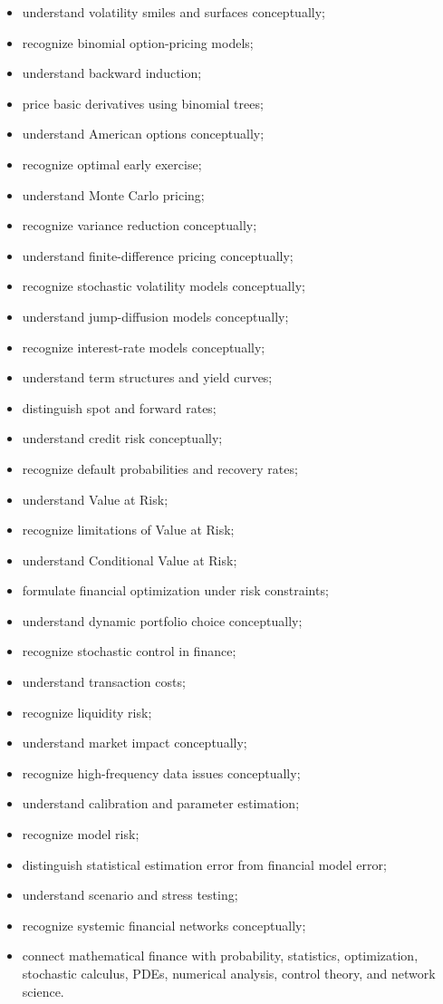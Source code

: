 {\begin{itemize}
    \item understand volatility smiles and surfaces conceptually;
    \item recognize binomial option-pricing models;
    \item understand backward induction;
    \item price basic derivatives using binomial trees;
    \item understand American options conceptually;
    \item recognize optimal early exercise;
    \item understand Monte Carlo pricing;
    \item recognize variance reduction conceptually;
    \item understand finite-difference pricing conceptually;
    \item recognize stochastic volatility models conceptually;
    \item understand jump-diffusion models conceptually;
    \item recognize interest-rate models conceptually;
    \item understand term structures and yield curves;
    \item distinguish spot and forward rates;
    \item understand credit risk conceptually;
    \item recognize default probabilities and recovery rates;
    \item understand Value at Risk;
    \item recognize limitations of Value at Risk;
    \item understand Conditional Value at Risk;
    \item formulate financial optimization under risk constraints;
    \item understand dynamic portfolio choice conceptually;
    \item recognize stochastic control in finance;
    \item understand transaction costs;
    \item recognize liquidity risk;
    \item understand market impact conceptually;
    \item recognize high-frequency data issues conceptually;
    \item understand calibration and parameter estimation;
    \item recognize model risk;
    \item distinguish statistical estimation error from financial model error;
    \item understand scenario and stress testing;
    \item recognize systemic financial networks conceptually;
    \item connect mathematical finance with probability, statistics,
          optimization, stochastic calculus, PDEs, numerical analysis,
          control theory, and network science.
\end{itemize}
}

